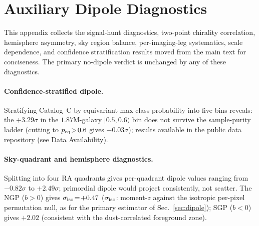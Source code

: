 \documentclass[aps,prd,twocolumn,superscriptaddress,preprintnumbers,nofootinbib,longbibliography,floatfix]{revtex4-2}
\newcommand{\sigmaunit}{\sigma}
\begin{document}
\section{Auxiliary Dipole Diagnostics}
\label{sec:app_aux}

This appendix collects the signal-hunt diagnostics, two-point chirality correlation, hemisphere asymmetry, sky region balance, per-imaging-leg systematics, scale dependence, and confidence stratification results moved from the main text for conciseness. The primary no-dipole verdict is unchanged by any of these diagnostics.

\paragraph{Confidence-stratified dipole.}
Stratifying Catalog~C by equivariant max-class probability into five bins reveals: the $+3.29\sigmaunit$ in the $1.87$M-galaxy $[0.5,0.6)$ bin does not survive the sample-purity ladder (cutting to $p_{\rm eq}\!>\!0.6$ gives $-0.03\sigmaunit$); results available in the public data repository (see Data Availability).

\paragraph{Sky-quadrant and hemisphere diagnostics.}
Splitting into four RA quadrants gives per-quadrant dipole values ranging from $-0.82\sigmaunit$ to $+2.49\sigmaunit$; primordial dipole would project consistently, not scatter. The NGP ($b\!>\!0$) gives $\sigma_{\rm iso}\!=\!+0.47$ ($\sigma_{\rm iso}$: moment-$z$ against the isotropic per-pixel permutation null, as for the primary estimator of Sec.~\ref{sec:dipole}); SGP ($b\!<\!0$) gives $+2.02$ (consistent with the dust-correlated foreground zone).
\end{document}
